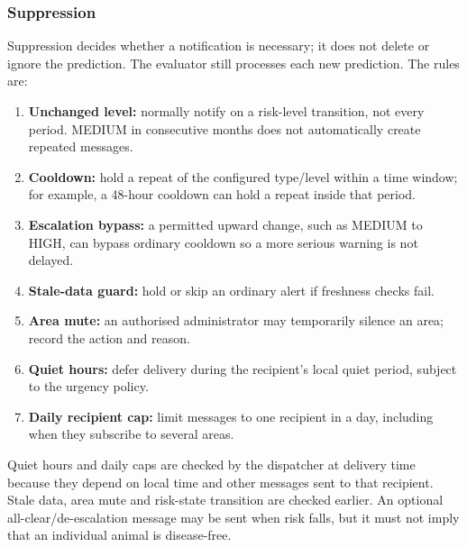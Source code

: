 \documentclass[10pt,openany]{report}
\begin{document}
\subsubsection{Suppression}
Suppression decides whether a notification is necessary; it does not delete or ignore the prediction. The evaluator still processes each new prediction. The rules are:
\begin{enumerate}
\item \textbf{Unchanged level:} normally notify on a risk-level transition, not every period. MEDIUM in consecutive months does not automatically create repeated messages.
\item \textbf{Cooldown:} hold a repeat of the configured type/level within a time window; for example, a 48-hour cooldown can hold a repeat inside that period.
\item \textbf{Escalation bypass:} a permitted upward change, such as MEDIUM to HIGH, can bypass ordinary cooldown so a more serious warning is not delayed.
\item \textbf{Stale-data guard:} hold or skip an ordinary alert if freshness checks fail.
\item \textbf{Area mute:} an authorised administrator may temporarily silence an area; record the action and reason.
\item \textbf{Quiet hours:} defer delivery during the recipient's local quiet period, subject to the urgency policy.
\item \textbf{Daily recipient cap:} limit messages to one recipient in a day, including when they subscribe to several areas.
\end{enumerate}
Quiet hours and daily caps are checked by the dispatcher at delivery time because they depend on local time and other messages sent to that recipient. Stale data, area mute and risk-state transition are checked earlier. An optional all-clear/de-escalation message may be sent when risk falls, but it must not imply that an individual animal is disease-free.
\end{document}
